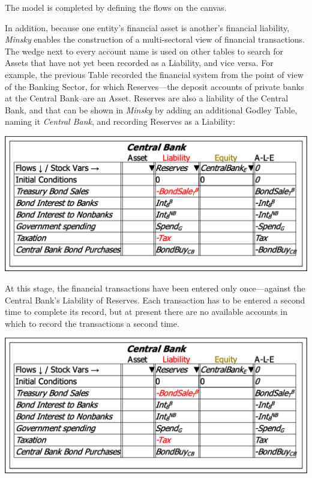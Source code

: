 The model is completed by defining the flows on the canvas.

In addition, because one entity's financial asset is another's financial
liability, \emph{Minsky} enables the construction of a multi-sectoral
view of financial transactions. The wedge next to every account name
is used on other tables to search for Assets that have not yet been
recorded as a Liability, and vice versa. For example, the previous
Table recorded the financial system from the point of view of the
Banking Sector, for which Reserves---the deposit accounts of private
banks at the Central Bank--are an Asset. Reserves are also a liability
of the Central Bank, and that can be shown in \emph{Minsky} by adding
an additional Godley Table, naming it \emph{Central Bank}, and recording
Reserves as a Liability:

\noindent\includegraphics[width=\textwidth]{images/GodleyTableSecondIncomplete}

At this stage, the financial transactions have been entered only once---against
the Central Bank's Liability of Reserves. Each transaction has to
be entered a second time to complete its record, but at present there
are no available accounts in which to record the transactions a second
time.

\noindent\includegraphics[width=\textwidth]{images/GodleyTableSecondIncomplete}

